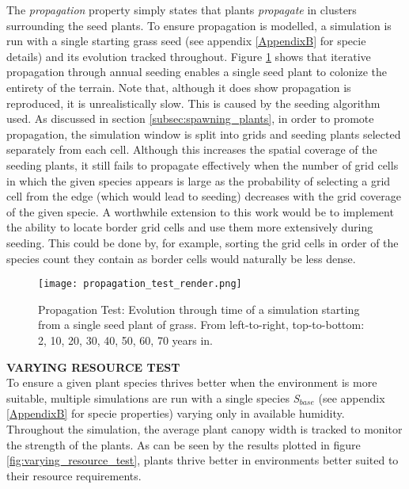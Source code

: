 The \textit{propagation} property simply states that plants \textit{propagate} in clusters surrounding the seed plants. To ensure propagation is modelled, a simulation is run with a single starting grass seed (see appendix \ref{AppendixB} for specie details) and its evolution tracked throughout. Figure \ref{fig:propagation_test_render} shows that iterative propagation through annual seeding enables a single seed plant to colonize the entirety of the terrain. Note that, although it does show propagation is reproduced, it is unrealistically slow. This is caused by the seeding algorithm used. As discussed in section \ref{subsec:spawning_plants}, in order to promote propagation, the simulation window is split into grids and seeding plants selected separately from each cell. Although this increases the spatial coverage of the seeding plants, it still fails to propagate effectively when the number of grid cells in which the given species appears is large as the probability of selecting a grid cell from the edge (which would lead to seeding) decreases with the grid coverage of the given specie. A worthwhile extension to this work would be to implement the ability to locate border grid cells and use them more extensively during seeding. This could be done by, for example, sorting the grid cells in order of the species count they contain as border cells would naturally be less dense. \\

\begin{figure}
\center
	\texttt{[image: propagation\_test\_render.png]}
	\caption{ Propagation Test: Evolution through time of a simulation starting from a single seed plant of grass. From left-to-right, top-to-bottom: 2, 10, 20, 30, 40, 50, 60, 70 years in.}
	\label{fig:propagation_test_render}
\end{figure}

\textbf{VARYING RESOURCE TEST} \\

To ensure a given plant species thrives better when the environment is more suitable, multiple simulations are run with a single species \textit{S$_{base}$} (see appendix \ref{AppendixB} for specie properties) varying only in available humidity. Throughout the simulation, the average plant canopy width is tracked to monitor the strength of the plants. As can be seen by the results plotted in figure \ref{fig:varying_resource_test}, plants thrive better in environments better suited to their resource requirements.\\

